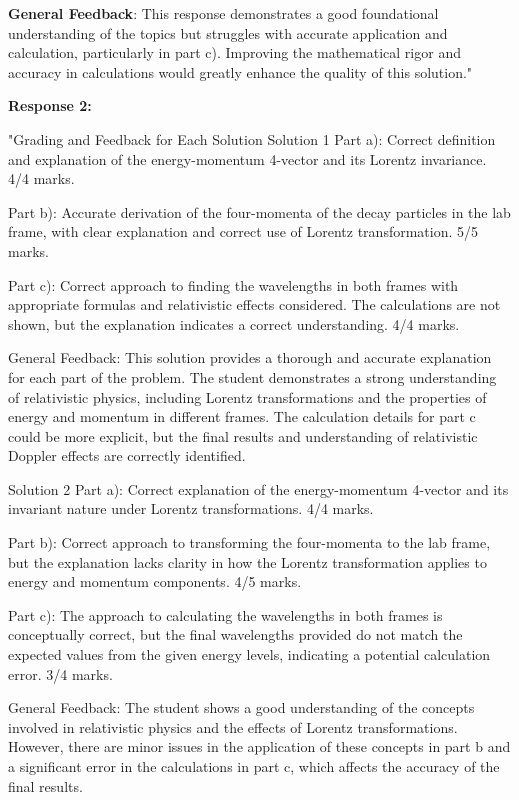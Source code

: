 \documentclass[a4paper,11pt]{article}
\begin{document}
\textbf{General Feedback}: This response demonstrates a good foundational understanding of the topics but struggles with accurate application and calculation, particularly in part c). Improving the mathematical rigor and accuracy in calculations would greatly enhance the quality of this solution."

\textbf{Response 2:}

"Grading and Feedback for Each Solution
Solution 1
Part a): Correct definition and explanation of the energy-momentum 4-vector and its Lorentz invariance. 4/4 marks.

Part b): Accurate derivation of the four-momenta of the decay particles in the lab frame, with clear explanation and correct use of Lorentz transformation. 5/5 marks.

Part c): Correct approach to finding the wavelengths in both frames with appropriate formulas and relativistic effects considered. The calculations are not shown, but the explanation indicates a correct understanding. 4/4 marks.

General Feedback: This solution provides a thorough and accurate explanation for each part of the problem. The student demonstrates a strong understanding of relativistic physics, including Lorentz transformations and the properties of energy and momentum in different frames. The calculation details for part c could be more explicit, but the final results and understanding of relativistic Doppler effects are correctly identified.

Solution 2
Part a): Correct explanation of the energy-momentum 4-vector and its invariant nature under Lorentz transformations. 4/4 marks.

Part b): Correct approach to transforming the four-momenta to the lab frame, but the explanation lacks clarity in how the Lorentz transformation applies to energy and momentum components. 4/5 marks.

Part c): The approach to calculating the wavelengths in both frames is conceptually correct, but the final wavelengths provided do not match the expected values from the given energy levels, indicating a potential calculation error. 3/4 marks.

General Feedback: The student shows a good understanding of the concepts involved in relativistic physics and the effects of Lorentz transformations. However, there are minor issues in the application of these concepts in part b and a significant error in the calculations in part c, which affects the accuracy of the final results.
\end{document}
